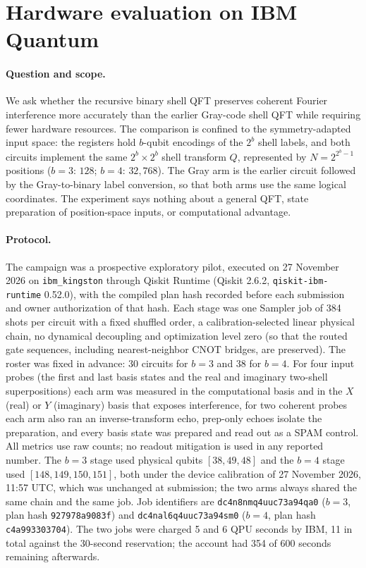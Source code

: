 \documentclass[11pt]{article}
\begin{document}
\section{Hardware evaluation on IBM Quantum}\label{sec:hardware}
\paragraph{Question and scope.} We ask whether the recursive binary shell QFT preserves coherent Fourier interference more accurately than the earlier Gray-code shell QFT while requiring fewer hardware resources. The comparison is confined to the symmetry-adapted input space: the registers hold $b$-qubit encodings of the $2^b$ shell labels, and both circuits implement the same $2^b\times2^b$ shell transform $Q$, represented by $N=2^{2^b-1}$ positions ($b=3$: $128$; $b=4$: $32{,}768$). The Gray arm is the earlier circuit followed by the Gray-to-binary label conversion, so that both arms use the same logical coordinates. The experiment says nothing about a general QFT, state preparation of position-space inputs, or computational advantage.

\paragraph{Protocol.} The campaign was a prospective exploratory pilot, executed on 27 November 2026 on \texttt{ibm\_kingston} through Qiskit Runtime (Qiskit 2.6.2, \texttt{qiskit-ibm-runtime} 0.52.0), with the compiled plan hash recorded before each submission and owner authorization of that hash. Each stage was one Sampler job of 384 shots per circuit with a fixed shuffled order, a calibration-selected linear physical chain, no dynamical decoupling and optimization level zero (so that the routed gate sequences, including nearest-neighbor CNOT bridges, are preserved). The roster was fixed in advance: 30 circuits for $b=3$ and 38 for $b=4$. For four input probes (the first and last basis states and the real and imaginary two-shell superpositions) each arm was measured in the computational basis and in the $X$ (real) or $Y$ (imaginary) basis that exposes interference, for two coherent probes each arm also ran an inverse-transform echo, prep-only echoes isolate the preparation, and every basis state was prepared and read out as a SPAM control. All metrics use raw counts; no readout mitigation is used in any reported number. The $b=3$ stage used physical qubits $[38,49,48]$ and the $b=4$ stage used $[148,149,150,151]$, both under the device calibration of 27 November 2026, 11:57 UTC, which was unchanged at submission; the two arms always shared the same chain and the same job. Job identifiers are \texttt{dc4n8nmq4uuc73a94qa0} ($b=3$, plan hash \texttt{927978a9083f}) and \texttt{dc4nal6q4uuc73a94sm0} ($b=4$, plan hash \texttt{c4a993303704}). The two jobs were charged 5 and 6 QPU seconds by IBM, 11 in total against the 30-second reservation; the account had 354 of 600 seconds remaining afterwards.
\end{document}
